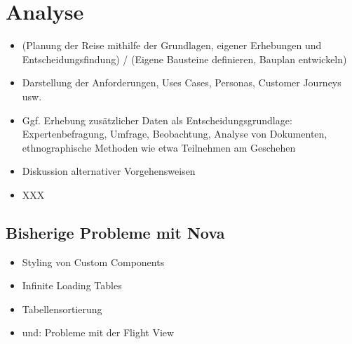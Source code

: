 \section{Analyse}
\begin{itemize}
    \item (Planung der Reise mithilfe der Grundlagen, eigener Erhebungen und Entscheidungsfindung) / (Eigene Bausteine definieren, Bauplan entwickeln)
    \item Darstellung der Anforderungen, Uses Cases, Personas, Customer Journeys usw.
    \item Ggf. Erhebung zusätzlicher Daten als Entscheidungsgrundlage: Expertenbefragung, Umfrage, Beobachtung, Analyse von Dokumenten, ethnographische Methoden wie etwa Teilnehmen am Geschehen
    \item Diskussion alternativer Vorgehensweisen
    \item XXX
\end{itemize}

\subsection{Bisherige Probleme mit Nova}
\begin{itemize}
    \item Styling von Custom Components
    \item Infinite Loading Tables
    \item Tabellensortierung
    \item und: Probleme mit der Flight View
\end{itemize}
